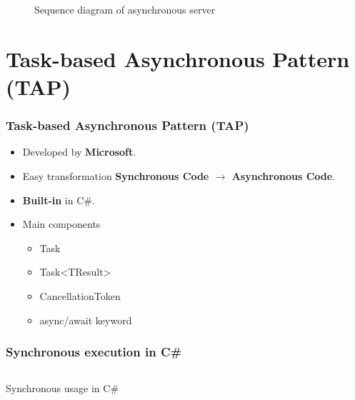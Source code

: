 \documentclass[11pt,t,usepdftitle=false,aspectratio=169,usenames,dvipsnames]{beamer}
\begin{document}
\begin{frame}
\begin{figure}[ht]
            \caption{Sequence diagram of asynchronous server}
            \label{figure:sequence-diagram-of-asynchronous-server}
        \end{figure}
    \end{frame}

    \section{Task-based Asynchronous Pattern (TAP)}
    \begin{frame}
        \frametitle{Task-based Asynchronous Pattern (TAP)}
        \begin{itemize}
            \item<1-> Developed by \textcolor{uibkblue}{\textbf{Microsoft}}.
            \item<2-> Easy transformation \textcolor{uibkblue}{\textbf{Synchronous Code $\rightarrow$ Asynchronous Code}}.
            \item<3-> \textcolor{uibkblue}{\textbf{Built-in}} in C\#.
            \item<4-> Main components
            \begin{itemize}
                \item<5-> Task
                \item<6-> Task<TResult>
                \item<7-> CancellationToken
                \item<8-> async/await keyword
            \end{itemize}
        \end{itemize}
    \end{frame}

    \begin{frame}
        \frametitle{Synchronous execution in C\#}
        
        \begin{listing}[H]
            \inputminted[framesep=2mm, baselinestretch=1.2, fontsize=\scriptsize, linenos]{csharp}{codes/example_synchronous.cs}
            \caption{Synchronous usage in C\#}
            \label{listing:synchronous-usage-in-csharp}
        \end{listing}
    \end{frame}
\end{document}
